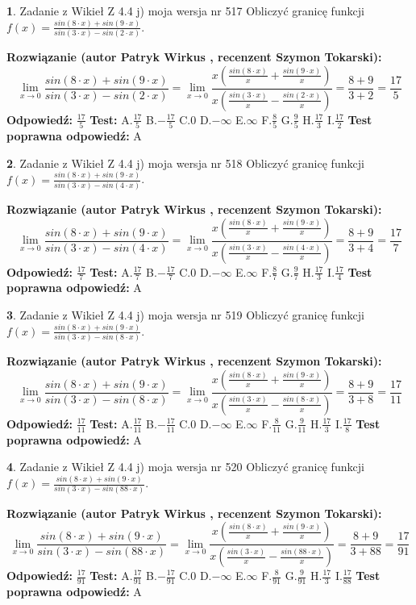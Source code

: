 \documentclass[12pt, a4paper]{article}
\theoremstyle{definition} %
\newtheorem{zad}{}
\newcommand{\zadStart}[1]{\begin{zad}#1\newline}
\newcommand{\zadStop}{\end{zad}}
\newcommand{\rozwStart}[2]{\noindent \textbf{Rozwiązanie (autor #1 , recenzent #2): }\newline}
\newcommand{\rozwStop}{\newline}
\newcommand{\odpStart}{\noindent \textbf{Odpowiedź:}\newline}
\newcommand{\odpStop}{\newline}
\newcommand{\testStart}{\noindent \textbf{Test:}\newline}
\newcommand{\testStop}{\newline}
\newcommand{\kluczStart}{\noindent \textbf{Test poprawna odpowiedź:}\newline}
\newcommand{\kluczStop}{\newline}
\begin{document}
\zadStart{Zadanie z Wikieł Z 4.4 j) moja wersja nr 517}
Obliczyć granicę funkcji $f(x)=\frac{sin(8\cdot x) +sin(9\cdot x)}{sin(3\cdot x) -sin(2\cdot x)}$.
\zadStop
\rozwStart{Patryk Wirkus}{Szymon Tokarski}
$$\lim\limits_{x\to 0}\frac{sin(8\cdot x) +sin(9\cdot x)}{sin(3\cdot x) -sin(2\cdot x)}=\lim\limits_{x\to 0}\frac{x(\frac{sin(8\cdot x)}{x}+\frac{sin(9\cdot x)}{x})}{x(\frac{sin(3\cdot x)}{x}-\frac{sin(2\cdot x)}{x})}=\frac{8+9}{3+2} = \frac{17}{5}$$
\rozwStop
\odpStart
$\frac{17}{5}$
\odpStop
\testStart
A.$\frac{17}{5}$
B.$-\frac{17}{5}$
C.$0$
D.$-\infty$
E.$\infty$
F.$\frac{8}{5}$
G.$\frac{9}{5}$
H.$\frac{17}{3}$
I.$\frac{17}{2}$
\testStop
\kluczStart
A
\kluczStop



\zadStart{Zadanie z Wikieł Z 4.4 j) moja wersja nr 518}
Obliczyć granicę funkcji $f(x)=\frac{sin(8\cdot x) +sin(9\cdot x)}{sin(3\cdot x) -sin(4\cdot x)}$.
\zadStop
\rozwStart{Patryk Wirkus}{Szymon Tokarski}
$$\lim\limits_{x\to 0}\frac{sin(8\cdot x) +sin(9\cdot x)}{sin(3\cdot x) -sin(4\cdot x)}=\lim\limits_{x\to 0}\frac{x(\frac{sin(8\cdot x)}{x}+\frac{sin(9\cdot x)}{x})}{x(\frac{sin(3\cdot x)}{x}-\frac{sin(4\cdot x)}{x})}=\frac{8+9}{3+4} = \frac{17}{7}$$
\rozwStop
\odpStart
$\frac{17}{7}$
\odpStop
\testStart
A.$\frac{17}{7}$
B.$-\frac{17}{7}$
C.$0$
D.$-\infty$
E.$\infty$
F.$\frac{8}{7}$
G.$\frac{9}{7}$
H.$\frac{17}{3}$
I.$\frac{17}{4}$
\testStop
\kluczStart
A
\kluczStop



\zadStart{Zadanie z Wikieł Z 4.4 j) moja wersja nr 519}
Obliczyć granicę funkcji $f(x)=\frac{sin(8\cdot x) +sin(9\cdot x)}{sin(3\cdot x) -sin(8\cdot x)}$.
\zadStop
\rozwStart{Patryk Wirkus}{Szymon Tokarski}
$$\lim\limits_{x\to 0}\frac{sin(8\cdot x) +sin(9\cdot x)}{sin(3\cdot x) -sin(8\cdot x)}=\lim\limits_{x\to 0}\frac{x(\frac{sin(8\cdot x)}{x}+\frac{sin(9\cdot x)}{x})}{x(\frac{sin(3\cdot x)}{x}-\frac{sin(8\cdot x)}{x})}=\frac{8+9}{3+8} = \frac{17}{11}$$
\rozwStop
\odpStart
$\frac{17}{11}$
\odpStop
\testStart
A.$\frac{17}{11}$
B.$-\frac{17}{11}$
C.$0$
D.$-\infty$
E.$\infty$
F.$\frac{8}{11}$
G.$\frac{9}{11}$
H.$\frac{17}{3}$
I.$\frac{17}{8}$
\testStop
\kluczStart
A
\kluczStop



\zadStart{Zadanie z Wikieł Z 4.4 j) moja wersja nr 520}
Obliczyć granicę funkcji $f(x)=\frac{sin(8\cdot x) +sin(9\cdot x)}{sin(3\cdot x) -sin(88\cdot x)}$.
\zadStop
\rozwStart{Patryk Wirkus}{Szymon Tokarski}
$$\lim\limits_{x\to 0}\frac{sin(8\cdot x) +sin(9\cdot x)}{sin(3\cdot x) -sin(88\cdot x)}=\lim\limits_{x\to 0}\frac{x(\frac{sin(8\cdot x)}{x}+\frac{sin(9\cdot x)}{x})}{x(\frac{sin(3\cdot x)}{x}-\frac{sin(88\cdot x)}{x})}=\frac{8+9}{3+88} = \frac{17}{91}$$
\rozwStop
\odpStart
$\frac{17}{91}$
\odpStop
\testStart
A.$\frac{17}{91}$
B.$-\frac{17}{91}$
C.$0$
D.$-\infty$
E.$\infty$
F.$\frac{8}{91}$
G.$\frac{9}{91}$
H.$\frac{17}{3}$
I.$\frac{17}{88}$
\testStop
\kluczStart
A
\kluczStop
\end{document}
